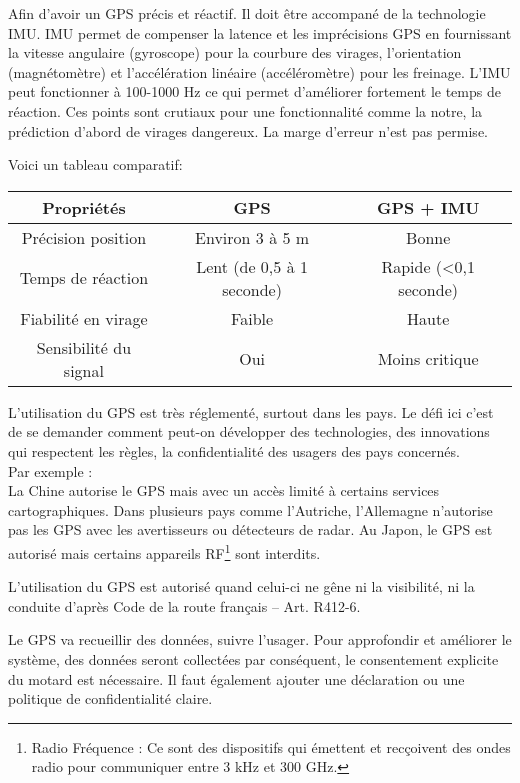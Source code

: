 \vspace{0.5cm}
Afin d'avoir un GPS précis et réactif. Il doit être accompané de la technologie IMU. IMU permet de compenser la latence et les imprécisions GPS en fournissant la vitesse angulaire (gyroscope) pour la courbure des virages, l'orientation (magnétomètre) et l'accélération linéaire (accéléromètre) pour les freinage. L'IMU peut fonctionner à 100-1000 Hz ce qui permet d'améliorer fortement le temps de réaction. Ces points sont crutiaux pour une fonctionnalité comme la notre, la prédiction d'abord de virages dangereux. La marge d'erreur n'est pas permise.

Voici un tableau comparatif:\\
\begin{tabular}{|c|c|c|}
\hline
\textbf{Propriétés} & \textbf{GPS} & \textbf{GPS + IMU} \\
\hline
Précision position & Environ 3 à 5 m & Bonne \\
Temps de réaction & Lent (de 0,5 à 1 seconde) & Rapide (<0,1 seconde)\\
Fiabilité en virage & Faible & Haute \\
Sensibilité du signal & Oui & Moins critique \\
\hline
\end{tabular}

L'utilisation du GPS est très réglementé, surtout dans les pays. Le défi ici c'est de se demander comment peut-on développer des technologies, des innovations qui respectent les règles, la confidentialité des usagers des pays concernés.\\

Par exemple :\\
La Chine autorise le GPS mais avec un accès limité à certains services cartographiques. Dans plusieurs pays comme l'Autriche, l'Allemagne n'autorise pas les GPS avec les avertisseurs ou détecteurs de radar. Au Japon, le GPS est autorisé mais certains appareils RF\footnote{Radio Fréquence : Ce sont des dispositifs qui émettent et recçoivent des ondes radio pour communiquer entre 3 kHz et 300 GHz.} sont interdits.


L'utilisation du GPS est autorisé quand celui-ci ne gêne ni la visibilité, ni la conduite d'après Code de la route français – Art. R412-6\cite{loi_code_de_la_route}.

Le GPS va recueillir des données, suivre l'usager. Pour approfondir et améliorer le système, des données seront collectées par conséquent, le consentement explicite du motard est nécessaire. Il faut également ajouter une déclaration ou une politique de confidentialité claire.

